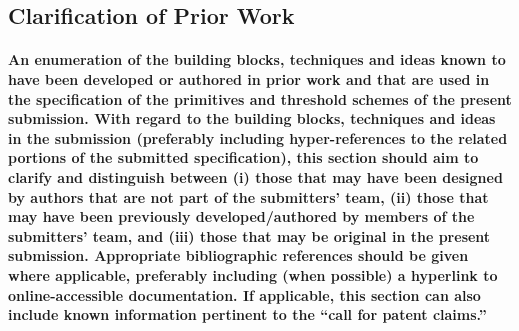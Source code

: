 \subsection{Clarification of Prior Work}

\paragraph{An enumeration of the building blocks, techniques and ideas known to have been developed or authored in prior work and that are used in the specification of the primitives and threshold schemes of the present submission. With regard to the building blocks, techniques and ideas in the submission (preferably including hyper-references to the related portions of the submitted specification), this section should aim to clarify and distinguish between (i) those that may have been designed by authors that are not part of the submitters’ team, (ii) those that may have been previously developed/authored by members of the submitters’ team, and (iii) those that may be original in the present submission. Appropriate bibliographic references should be given where applicable, preferably including (when possible) a hyperlink to online-accessible documentation. If applicable, this section can also include known information pertinent to the “call for patent claims.”}
%
%
%
%
$\text{ }$

